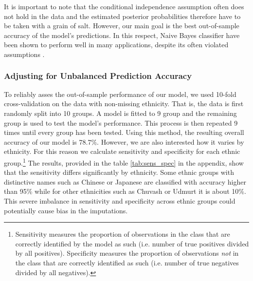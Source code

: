 It is important to note that the conditional independence assumption often does not hold in the data and the estimated posterior probabilities therefore have to be taken with a grain of salt. %
However, our main goal is the best out-of-sample accuracy of the model's predictions. In this respect, Naive Bayes classifier have been shown to perform  well in many applications, despite its often violated assumptions \citep{domingos_optimality_1997}.

\subsubsection{Adjusting for Unbalanced Prediction Accuracy}
To reliably asses the out-of-sample performance of our model, we used 10-fold cross-validation on the data with non-missing ethnicity. That is, the data is first randomly split into 10 groups. A model is fitted to 9 group and the remaining group is used to test the model's performance. This process is then repeated 9 times  until every group has been tested. 
Using this method, the resulting overall accuracy of our model is 78.7\%. However,  we are also interested how it varies by ethnicity.
For this reason we calculate sensitivity and specificity for each ethnic group.\footnote{Sensitivity measures the proportion of observations in the class that are correctly identified by the model as such (i.e. number of true positives divided by all positives). Specificity measures the proportion of observations \emph{not} in the class that are correctly identified as such (i.e. number of true negatives divided by all negatives).} 
The results, provided in the table \ref{tab:sens_spec} in the appendix, show that the sensitivity differs significantly by ethnicity. 
Some ethnic groups with distinctive names such as Chinese or Japanese are classified  with accuracy higher than 95\%  while for other ethnicities such as Chuvash or Udmurt it is about 10\%. This severe imbalance in sensitivity and specificity  across ethnic groups could potentially cause bias in the imputations. 

